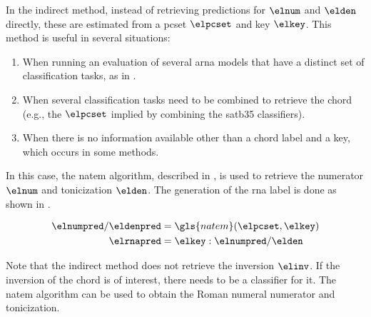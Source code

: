 

In the indirect method, instead of retrieving predictions
for $\elnum$ and $\elden$ directly, these are estimated from
a \gls{pcset} $\elpcset$ and key $\elkey$. This method is
useful in several situations: 
\begin{enumerate}
    \item When running an evaluation of several \gls{arna}
    models that have a distinct set of classification tasks,
    as in .
    \item When several classification tasks need to be
    combined to retrieve the chord (e.g., the $\elpcset$
    implied by combining the \gls{satb35} classifiers).
    \item When there is no information available other than
    a chord label and a key, which occurs in some methods.
\end{enumerate}

In this case, the \gls{natem} algorithm, described in
, is
used to retrieve the numerator $\elnum$ and tonicization
$\elden$. The generation of the \gls{rna} label is done as
shown in .

\begin{equation}
    \label{eq:rna_indirect}
    \begin{split}
        \elnumpred / \eldenpred &= \gls{natem}(\elpcset, \elkey) \\
        \elrnapred &= \elkey : \elnumpred / \elden 
    \end{split}
\end{equation}

Note that the indirect method does not retrieve the
inversion $\elinv$. If the inversion of the chord is of
interest, there needs to be a classifier for it. The
\gls{natem} algorithm can be used to obtain the Roman
numeral numerator and tonicization.




